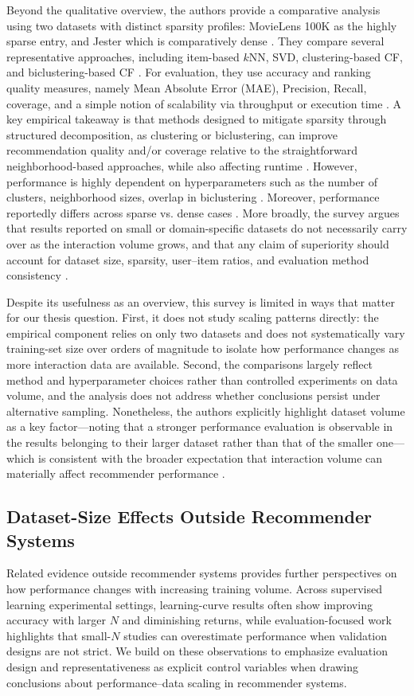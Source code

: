\documentclass[12pt,a4paper]{article}
\begin{document}
Beyond the qualitative overview, the authors provide a comparative analysis using two datasets with distinct sparsity profiles: MovieLens 100K as the highly sparse entry, and Jester which is comparatively dense \cite{singh2020}. They compare several representative approaches, including item-based $k$NN, SVD, clustering-based CF, and biclustering-based CF \cite{singh2020}. For evaluation, they use accuracy and ranking quality measures, namely Mean Absolute Error (MAE), Precision, Recall, coverage, and a simple notion of scalability via throughput or execution time \cite{singh2020}. A key empirical takeaway is that methods designed to mitigate sparsity through structured decomposition, as clustering or biclustering, can improve recommendation quality and/or coverage relative to the straightforward neighborhood-based approaches, while also affecting runtime \cite{singh2020}. However, performance is highly dependent on hyperparameters such as the number of clusters, neighborhood sizes, overlap in biclustering \cite{singh2020}. Moreover, performance reportedly differs across sparse vs. dense cases \cite{singh2020}. More broadly, the survey argues that results reported on small or domain-specific datasets do not necessarily carry over as the interaction volume grows, and that any claim of superiority should account for dataset size, sparsity, user--item ratios, and evaluation method consistency \cite{singh2020}.

Despite its usefulness as an overview, this survey is limited in ways that matter for our thesis question. First, it does not study scaling patterns directly: the empirical component relies on only two datasets and does not systematically vary training-set size over orders of magnitude to isolate how performance changes as more interaction data are available. Second, the comparisons largely reflect method and hyperparameter choices rather than controlled experiments on data volume, and the analysis does not address whether conclusions persist under alternative sampling. Nonetheless, the authors explicitly highlight dataset volume as a key factor---noting that a stronger performance evaluation is observable in the results belonging to their larger dataset rather than that of the smaller one---which is consistent with the broader expectation that interaction volume can materially affect recommender performance \cite{singh2020}.

\subsection{Dataset-Size Effects Outside Recommender Systems}
Related evidence outside recommender systems provides further perspectives on how performance changes with increasing training volume. Across supervised learning experimental settings, learning-curve results often show improving accuracy with larger $N$ and diminishing returns, while evaluation-focused work highlights that small-$N$ studies can overestimate performance when validation designs are not strict. We build on these observations to emphasize evaluation design and representativeness as explicit control variables when drawing conclusions about performance--data scaling in recommender systems.
\end{document}
